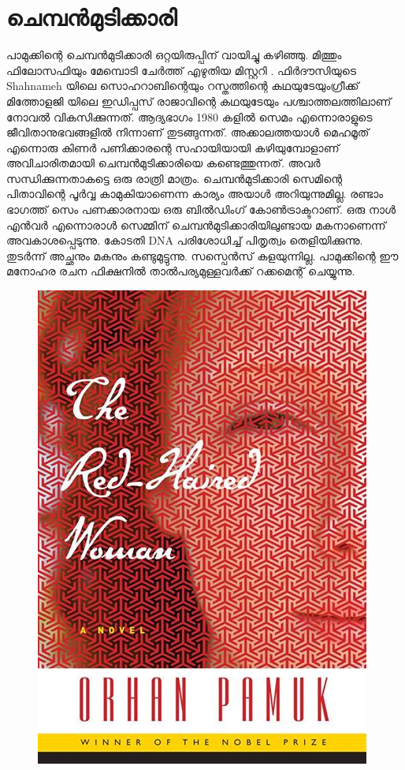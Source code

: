 \documentclass[10pt,a4paper]{report}
\begin{document}
\section{ചെമ്പൻമുടിക്കാരി }    
    പാമുക്കിന്റെ ചെമ്പൻമുടിക്കാരി ഒറ്റയിരുപ്പിന് വായിച്ചു കഴിഞ്ഞു. മിത്തും ഫിലോസഫിയും മേമ്പൊടി ചേർത്ത് എഴുതിയ മിസ്റ്ററി . ഫിർദൗസിയുടെ Shahnameh യിലെ സൊഹറാബിന്റെയും റസ്തത്തിന്റെ കഥയുടേയുംഗ്രീക്ക് മിത്തോളജി യിലെ ഇഡിപ്പസ് രാജാവിന്റെ കഥയുടേയും പശ്ചാത്തലത്തിലാണ് നോവൽ വികസിക്കുന്നത്. ആദ്യഭാഗം 1980 കളിൽ സെമം എന്നൊരാളുടെ ജീവിതാനുഭവങ്ങളിൽ നിന്നാണ് തുടങ്ങുന്നത്. അക്കാലത്തയാൾ മെഹമൂത് എന്നൊരു കിണർ പണിക്കാരന്റെ സഹായിയായി കഴിയുമ്പോളാണ് അവിചാരിതമായി ചെമ്പൻമുടിക്കാരിയെ കണ്ടെത്തുന്നത്. അവർ സന്ധിക്കുന്നതാകട്ടെ ഒരു രാത്രി മാത്രം. ചെമ്പൻമുടിക്കാരി സെമിന്റെ പിതാവിന്റെ പൂർവ്വ കാമുകിയാണെന്ന കാര്യം അയാൾ അറിയുന്നുമില്ല. രണ്ടാം ഭാഗത്ത് സെം പണക്കാരനായ ഒരു ബിൽഡിംഗ് കോൺട്രാക്ടറാണ്. ഒരു നാൾ എൻവർ എന്നൊരാൾ സെമ്മിന് ചെമ്പൻമുടിക്കാരിയിലുണ്ടായ മകനാണെന്ന് അവകാശപ്പെടുന്നു. കോടതി DNA പരിശോധിച്ച് പിതൃത്വം തെളിയിക്കുന്നു. തുടർന്ന് അച്ഛനും മകനും കണ്ടുമുട്ടുന്നു. സസ്പെൻസ് കളയുന്നില്ല. പാമുക്കിന്റെ ഈ മനോഹര രചന ഫിക്ഷനിൽ താൽപര്യമുള്ളവർക്ക് റക്കമെന്റ് ചെയ്യുന്നു.
    
    \begin{figure}[H]
  \center
\includegraphics[scale=.25]{images/pamuk}
\label{pamuk}
\caption{   }
\end{figure}
\end{document}
